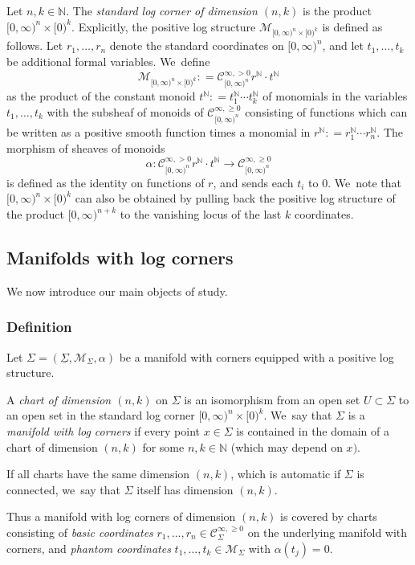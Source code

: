 \documentclass[JEP,XML,SOM,Unicode,NoFloatCountersInSection,published]{cedram}
\theoremstyle{definition}
\theoremstyle{remark}
\newenvironment{example}
  {\pushQED{\qed}\renewcommand{\qedsymbol}{$\lozenge$}\examplex}
  {\popQED\endexamplex}
\let\defn\emph
\newcommand{\NN}{\mathbb{N}}
\newcommand{\model}[2]{\halfspc{#1}\times[0)^{#2}}
\newcommand{\halfspc}[1]{[0,\infty)^{#1}}
\renewcommand{\ge}{\geqslant}
\newcommand{\defas}{\mathrel{\mathop:}=}
\newcommand{\cM}{\mathscr{M}}
\newcommand{\Cinfpos}[1]{\mathscr{C}^{\infty, > 0}_{#1}}
\newcommand{\Cinfge}[1]{\mathscr{C}^{\infty, \ge 0}_{#1}}
\newcommand{\Sig}{\Sigma}
\newcommand{\uSig}{\underline{\Sigma}}
\begin{document}
\begin{example}\label{ex:std-corner}
Let $n, k \in \NN$. The \defn{standard log corner of dimension $(n,k)$} is the product $\model{n}{k}$.
Explicitly, the positive log structure $\cM_{\model{n}{k}}$ is defined as follows.
Let $r_1,\ldots,r_n$ denote the standard coordinates on $\halfspc{n}$, and let $t_1,\ldots,t_k$ be additional formal variables. We~define
\[
\cM_{\model{n}{k}} \defas \Cinfpos{\halfspc{n}}r^\NN \cdot t^\NN
\]
as the product of the constant monoid $t^\NN\defas t_1^\NN\cdots t_k^\NN$ of monomials in the variables $t_1,\ldots,t_k$ with the subsheaf of monoids of $\Cinfge{\halfspc{n}}$ consisting of functions which can be written as a positive smooth function times a monomial in $r^\NN \defas r_1^\NN\cdots r_n^\NN$.
The morphism of sheaves of monoids
\[
\alpha\colon \Cinfpos{\halfspc{n}}r^\NN \cdot t^\NN \to \Cinfge{\halfspc{n}}
\]
is defined as the identity on functions of $r$, and sends each $t_i$ to $0$. We~note that $[0,\infty)^n\times [0)^k$ can also be obtained by pulling back the positive log structure of the product $[0,\infty)^{n+k}$ to the vanishing locus of the last $k$ coordinates.
\end{example}

\subsection{Manifolds with log corners}
We now introduce our main objects of study.

\subsubsection{Definition} Let $\Sig=(\uSig,\cM_\Sig,\alpha)$ be a manifold with corners equipped with a positive log structure.
\begin{definition}\label{def:chart}
A \defn{chart of dimension $(n,k)$} on $\Sig$ is an isomorphism from an open set $U \subset \Sig$ to an open set in the standard log corner $\model{n}{k}$. We~say that $\Sig$ is a \defn{manifold with log corners} if every point $x \in \Sig$ is contained in the domain of a chart of dimension $(n,k)$ for some $n,k\in\NN$ (which may depend on $x)$.
\end{definition}
If all charts have the same dimension $(n,k)$, which is automatic if $\Sig$ is connected, we~say that $\Sig$ itself has dimension $(n,k)$.

Thus a manifold with log corners of dimension $(n,k)$ is covered by charts consisting of \defn{basic coordinates} $r_1,\ldots,r_n \in \Cinfge{\Sig}$ on the underlying manifold with corners, and \defn{phantom coordinates} $t_1,\ldots,t_k \in \cM_{\Sig}$ with $\alpha(t_j) =0$.
\end{document}
